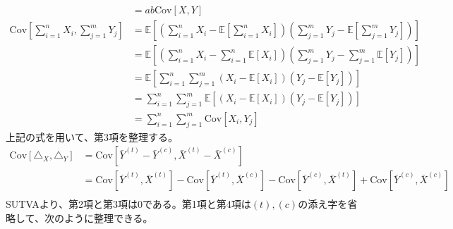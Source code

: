 \begin{align}
                                                                        & = ab\text{Cov}[X, Y]                                                                                                                                                                        \\
    \text{Cov}\left[\sum_{i = 1}^{n}X_{i}, \sum_{j = 1}^{m}Y_{j}\right] & = \mathbb{E}\left[\left(\sum_{i = 1}^{n}X_{i} - \mathbb{E}\left[\sum_{i = 1}^{n}X_{i}\right]\right)\left(\sum_{j = 1}^{m}Y_{j} - \mathbb{E}\left[\sum_{j = 1}^{m}Y_{j}\right]\right)\right] \\
                                                                        & = \mathbb{E}\left[\left(\sum_{i = 1}^{n}X_{i} - \sum_{i = 1}^{n}\mathbb{E}[X_{i}]\right)\left(\sum_{j = 1}^{m}Y_{j} - \sum_{j = 1}^{m}\mathbb{E}[Y_{j}]\right)\right]                       \\
                                                                        & = \mathbb{E}\left[\sum_{i = 1}^{n}\sum_{j = 1}^{m}(X_{i} - \mathbb{E}[X_{i}])(Y_{j} - \mathbb{E}[Y_{j}])\right]                                                                             \\
                                                                        & = \sum_{i = 1}^{n}\sum_{j = 1}^{m} \mathbb{E}\left[(X_{i} - \mathbb{E}[X_{i}])(Y_{j} - \mathbb{E}[Y_{j}])\right]                                                                            \\
                                                                        & = \sum_{i = 1}^{n}\sum_{j = 1}^{m} \text{Cov}[X_{i}, Y_{j}]
\end{align}
上記の式を用いて、第3項を整理する。
\begin{align}
    \text{Cov}[\triangle_{X}, \triangle_{Y}] & = \text{Cov}[\bar{Y}^{(t)} - \bar{Y}^{(c)}, \bar{X}^{(t)} - \bar{X}^{(c)}]                                                                                                  \\
                                             & = \text{Cov}[\bar{Y}^{(t)}, \bar{X}^{(t)}] - \text{Cov}[\bar{Y}^{(t)}, \bar{X}^{(c)}] - \text{Cov}[\bar{Y}^{(c)}, \bar{X}^{(t)}] + \text{Cov}[\bar{Y}^{(c)}, \bar{X}^{(c)}] \\
\end{align}
SUTVAより、第2項と第3項は0である。第1項と第4項は$(t), (c)$の添え字を省略して、次のように整理できる。
